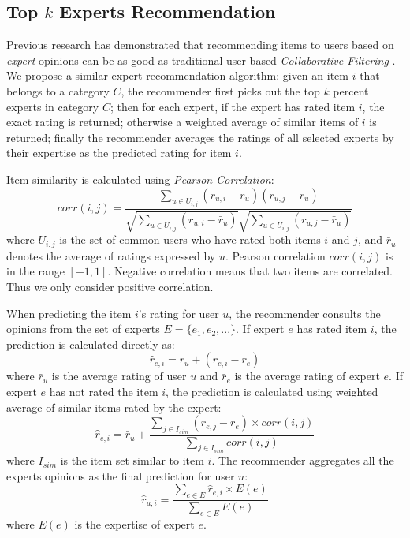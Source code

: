 \documentclass[12pt]{article}
\begin{document}

\subsection{Top $k$ Experts Recommendation} %
\label{sub:expert_recommendation}

Previous research has demonstrated that recommending items to users based on \emph{expert} opinions can be as good as traditional user-based \emph{Collaborative Filtering} \cite{Amatriain:2009p101}. We propose a similar expert recommendation algorithm: given an item $i$ that belongs to a category $C$, the recommender first picks out the top $k$ percent experts in category $C$; then for each expert, if the expert has rated item $i$, the exact rating is returned; otherwise a weighted average of similar items of $i$ is returned; finally the recommender averages the ratings of all selected experts by their expertise as the predicted rating for item $i$. 

Item similarity is calculated using \emph{Pearson Correlation}:
\begin{equation}
	corr(i,j) = \frac{\sum_{u \in U_{i,j}} (r_{u,i} - \bar{r}_u)(r_{u,j} - \bar{r}_u)} {{\sqrt{\sum_{u \in U_{i,j}} (r_{u,i} - \bar{r}_u)}} \sqrt{\sum_{u \in U_{i,j}} (r_{u,j} - \bar{r}_u)}}
\end{equation}
where $U_{i,j}$ is the set of common users who have rated both items $i$ and $j$, and $\bar{r}_u$ denotes the average of ratings expressed by $u$. Pearson correlation $corr(i,j)$ is in the range $[-1,1]$. Negative correlation means that two items are correlated. Thus we only consider positive correlation.

When predicting the item $i$'s rating for user $u$, the recommender consults the opinions from the set of experts $E = \{e_1, e_2, ...\}$. If expert $e$ has rated item $i$, the prediction is calculated directly as:
\begin{equation}
	\hat{r}_{e,i} = \bar{r}_u + (r_{e,i} - \bar{r}_e)
\end{equation}
where $\bar{r}_u$ is the average rating of user $u$ and $\bar{r}_e$ is the average rating of expert $e$. If expert $e$ has not rated the item $i$, the prediction is calculated using weighted average of similar items rated by the expert:
\begin{equation}
	\hat{r}_{e,i} = \bar{r}_u + \frac{\sum_{j \in I_{sim}} (r_{e,j} - \bar{r}_e) \times corr(i,j)} {\sum_{j \in I_{sim}} corr(i,j)}
\end{equation}
where $I_{sim}$ is the item set similar to item $i$. The recommender aggregates all the experts opinions as the final prediction for user $u$:
\begin{equation}
	\hat{r}_{u,i} = \frac{ \sum_{e \in E} \hat{r}_{e,i} \times E(e) } { \sum_{e \in E} E(e) }
\end{equation}
where $E(e)$ is the expertise of expert $e$.
 
\end{document}
